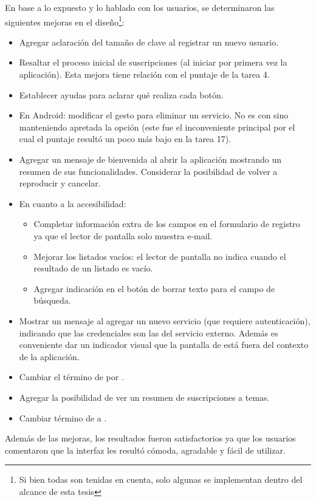 
En base a lo expuesto y lo hablado con los usuarios, se determinaron las siguientes mejoras en el diseño\footnote{Si bien todas son tenidas en cuenta, solo algunas se implementan dentro del alcance de esta tesis}:
\begin{itemize}
\item Agregar aclaración del tamaño de clave al registrar un nuevo usuario. 
\item Resaltar el proceso inicial de suscripciones (al iniciar por primera vez la aplicación). Esta mejora tiene relación con el puntaje de la tarea 4.
\item Establecer ayudas para aclarar qué realiza cada botón.
\item En Android: modificar el gesto para eliminar un servicio. No es con  sino manteniendo apretada la opción (este fue el inconveniente principal por el cual el puntaje resultó un poco más bajo en la tarea 17).
\item Agregar un mensaje de bienvenida al abrir la aplicación mostrando un resumen de sus funcionalidades. Considerar la posibilidad de volver a reproducir y cancelar.
\item En cuanto a la accesibilidad:
\begin{itemize}
\item Completar información extra de los campos en el formulario de registro ya que el lector de pantalla solo muestra e-mail.
\item Mejorar los listados vacíos: el lector de pantalla no indica cuando el resultado de un listado es vacío.
\item Agregar indicación en el botón de borrar texto para el campo de búsqueda. 
\end{itemize}
\item Mostrar un mensaje al agregar un nuevo servicio (que requiere autenticación), indicando que las credenciales son las del servicio externo. Además es conveniente dar un indicador visual que la pantalla de   está fuera del contexto de la aplicación.
\item Cambiar el término de  por .
\item Agregar la posibilidad de ver un resumen de suscripciones a temas.
\item Cambiar término de  a .
\end{itemize}

Además de las mejoras, los resultados fueron satisfactorios ya que los usuarios comentaron que la interfaz les resultó cómoda, agradable y fácil de utilizar.

